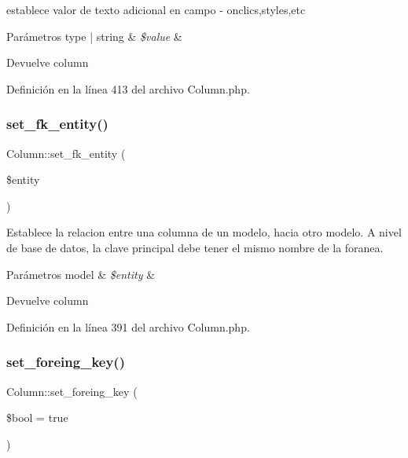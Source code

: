 establece valor de texto adicional en campo -\/ onclics,styles,etc


\begin{DoxyParams}[1]{Parámetros}
type | string & {\em \$value} & \\
\hline
\end{DoxyParams}
\begin{DoxyReturn}{Devuelve}
column 
\end{DoxyReturn}


Definición en la línea 413 del archivo Column.\+php.

\mbox{\label{class_column_ac98ea0f2cf873e1169d470b6b8aed87e}} 
\subsubsection{\texorpdfstring{set\_fk\_entity()}{set\_fk\_entity()}}
{\footnotesize\ttfamily Column\+::set\+\_\+fk\+\_\+entity (\begin{DoxyParamCaption}\item[{}]{\$entity }\end{DoxyParamCaption})}

Establece la relacion entre una columna de un modelo, hacia otro modelo. A nivel de base de datos, la clave principal debe tener el mismo nombre de la foranea.


\begin{DoxyParams}[1]{Parámetros}
model & {\em \$entity} & \\
\hline
\end{DoxyParams}
\begin{DoxyReturn}{Devuelve}
column 
\end{DoxyReturn}


Definición en la línea 391 del archivo Column.\+php.

\mbox{\label{class_column_a5ec7cacb0cd684328df7e04a9bf1e891}} 
\subsubsection{\texorpdfstring{set\_foreing\_key()}{set\_foreing\_key()}}
{\footnotesize\ttfamily Column\+::set\+\_\+foreing\+\_\+key (\begin{DoxyParamCaption}\item[{}]{\$bool = {\ttfamily true} }\end{DoxyParamCaption})}

